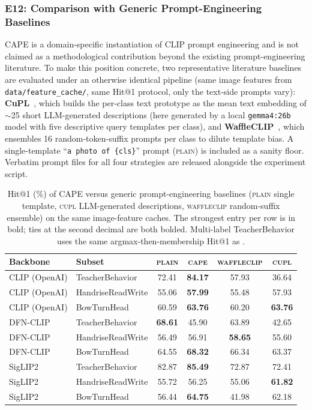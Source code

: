 \documentclass[electronics,article,submit,pdftex,moreauthors]{Definitions/mdpi}
\begin{document}
\subsubsection{E12: Comparison with Generic Prompt-Engineering Baselines}
\label{sec:e12_prompt_baselines}

CAPE is a domain-specific instantiation of CLIP prompt engineering and is not claimed as a methodological contribution beyond the existing prompt-engineering literature. To make this position concrete, two representative literature baselines are evaluated under an otherwise identical pipeline (same image features from \texttt{data/feature\_cache/}, same Hit@1 protocol, only the text-side prompts vary): \textbf{CuPL}~\cite{pratt2023cupl}, which builds the per-class text prototype as the mean text embedding of $\sim$25 short LLM-generated descriptions (here generated by a local \texttt{gemma4:26b} model with five descriptive query templates per class), and \textbf{WaffleCLIP}~\cite{roth2023waffleclip}, which ensembles 16 random-token-suffix prompts per class to dilute template bias. A single-template ``\texttt{a photo of \{cls\}}'' prompt (\textsc{plain}) is included as a sanity floor. Verbatim prompt files for all four strategies are released alongside the experiment script.

\begin{table}[H]
\caption{Hit@1 (\%) of CAPE versus generic prompt-engineering baselines (\textsc{plain} single template, \textsc{cupl} LLM-generated descriptions, \textsc{waffleclip} random-suffix ensemble) on the same image-feature caches. The strongest entry per row is in bold; ties at the second decimal are both bolded. Multi-label TeacherBehavior uses the same argmax-then-membership Hit@1 as .}
\label{tab:prompt_baselines}
\centering
\small
\setlength{\tabcolsep}{4pt}
\begin{tabular}{l l cccc}
\toprule
\textbf{Backbone} & \textbf{Subset} & \textsc{plain} & \textsc{cape} & \textsc{waffleclip} & \textsc{cupl} \\
\midrule
CLIP (OpenAI) & TeacherBehavior   & 72.41 & \textbf{84.17} & 57.93 & 36.64 \\
CLIP (OpenAI) & HandriseReadWrite & 55.06 & \textbf{57.99} & 55.48 & 57.93 \\
CLIP (OpenAI) & BowTurnHead       & 60.59 & \textbf{63.76} & 60.20 & \textbf{63.76} \\
DFN-CLIP & TeacherBehavior        & \textbf{68.61} & 45.90 & 63.89 & 42.65 \\
DFN-CLIP & HandriseReadWrite      & 56.49 & 56.91 & \textbf{58.65} & 55.60 \\
DFN-CLIP & BowTurnHead            & 64.55 & \textbf{68.32} & 66.34 & 63.37 \\
SigLIP2 & TeacherBehavior         & 82.87 & \textbf{85.49} & 72.87 & 72.41 \\
SigLIP2 & HandriseReadWrite       & 55.72 & 56.25 & 55.06 & \textbf{61.82} \\
SigLIP2 & BowTurnHead             & 56.44 & \textbf{64.75} & 41.98 & 62.18 \\
\bottomrule
\end{tabular}
\end{table}
\end{document}
